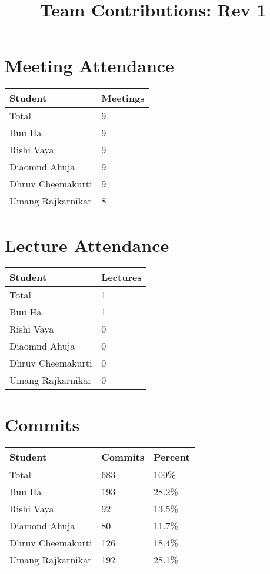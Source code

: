 \documentclass{article}
\title{Team Contributions: Rev 1\\\progname}
\author{\authname}
\date{}
\begin{document}
\maketitle


\section{Meeting Attendance}

\begin{table}[H]
\centering
\begin{tabular}{ll}
\toprule
\textbf{Student} & \textbf{Meetings}\\
\midrule
Total & 9\\
Buu Ha & 9\\
Rishi Vaya & 9\\
Diaomnd Ahuja & 9\\
Dhruv Cheemakurti & 9\\
Umang Rajkarnikar & 8\\
\bottomrule
\end{tabular}
\end{table}

\section{Lecture Attendance}

\begin{table}[H]
\centering
\begin{tabular}{ll}
\toprule
\textbf{Student} & \textbf{Lectures}\\
\midrule
Total & 1\\
Buu Ha & 1\\
Rishi Vaya & 0\\
Diaomnd Ahuja & 0\\
Dhruv Cheemakurti & 0\\
Umang Rajkarnikar & 0\\
\bottomrule
\end{tabular}
\end{table}

\section{Commits}

\begin{table}[H]
\centering
\begin{tabular}{lll}
\toprule
\textbf{Student} & \textbf{Commits} & \textbf{Percent}\\
\midrule
Total & 683 & 100\% \\
Buu Ha & 193 & 28.2\% \\
Rishi Vaya & 92 & 13.5\% \\
Diamond Ahuja & 80 & 11.7\% \\
Dhruv Cheemakurti & 126 & 18.4\% \\
Umang Rajkarnikar & 192 & 28.1\% \\
\bottomrule
\end{tabular}
\end{table}
\end{document}
